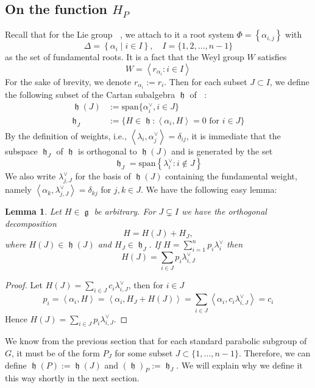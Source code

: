 \documentclass[12pt]{article} %
\newtheorem{lemma}[definition]{Lemma}
\DeclareMathOperator{\SLn}{\text{SL}_n(\mathbb{R})}
\DeclareMathOperator{\fg}{\mathfrak{g}}
\DeclareMathOperator{\fh}{\mathfrak{h}}
\DeclareMathOperator{\slnr}{\mathfrak{sl}_n(\mathbb{R})}
\begin{document}
\subsection{On the function $H_P$}
Recall that for the Lie group $\SLn$, we attach to it a root system $\Phi = \left\lbrace \alpha_{i,j}\right\rbrace$ with
\[\Delta = \left\lbrace \alpha_i\mid i \in I \right\rbrace, \quad I = \{1,2,\ldots,n-1\}\]
as the set of fundamental roots. It is a fact that the Weyl group $W$ satisfies
\[W = \left\langle r_{\alpha_i}: i \in I \right\rangle\]
For the sake of brevity, we denote $r_{\alpha_i}:=r_i$. Then for each subset $J \subset I$,
we define the following subset of the Cartan subalgebra $\fh$ of $\slnr$:
\begin{align*}
    \fh(J) & :=\text{span}\{ \alpha^\vee_i, i \in J\}                                       \\
    \fh_J  & := \{H \in \fh: \left\langle \alpha_i,H\right\rangle=0 \mbox{ for } i \in J \}
\end{align*}
By the definition of weights, i.e., $\left\langle \lambda_i,\alpha^\vee_j \right\rangle = \delta_{ij}$, it is immediate
that the subspace $\fh_J$ of $\fh$ is orthogonal to $\fh(J)$ and is generated by the set
\[\fh_J = \text{span}\left\lbrace \lambda^\vee_i: i \notin J\right\rbrace \]
We also write $\lambda^{\vee}_{j,J}$ for the basis of $\fh(J)$ containing the fundamental
weight, namely $\left\langle \alpha_k,\lambda^{\vee}_{j,J}\right\rangle = \delta_{kj}$ for $j,k \in J$. We have
the following easy lemma:
\begin{lemma}\label{coeff-H(J)}
    Let $H \in \fg$ be arbitrary. For $J \subsetneq I$ we have the orthogonal decomposition
    \[H = H(J)+H_J,\]
    where $H(J) \in \fh(J)$ and $H_J \in \fh_J$. If $H = \sum_{i=1}^n p_i\lambda^\vee_i$ then
    \[H(J) = \sum_{i \in J} p_i \lambda^\vee_{i,J}\]
\end{lemma}
\begin{proof}
    Let $H(J) = \sum_{i \in J} c_i \lambda^\vee_{i,J}$, then for $i \in J$
    \[p_i = \left\langle \alpha_i,H \right\rangle =\left\langle \alpha_i,H_J+H(J) \right\rangle = \sum_{i \in J}\left\langle \alpha_i,  c_i \lambda^\vee_{i,J}\right\rangle=c_i \]
    Hence $H(J) = \sum_{i \in J} p_i \lambda^\vee_{i,J}$.
\end{proof}
We know from the previous section that for each standard parabolic subgroup of $G$, it must be of the form
$P_J$ for some subset $J \subset \{1,\ldots,n-1\}$. Therefore, we can define $\fh(P):= \fh(J)$ and $ (\fh)_P:= \fh_J$. We will explain why we define it this way shortly in the next section.
\end{document}
